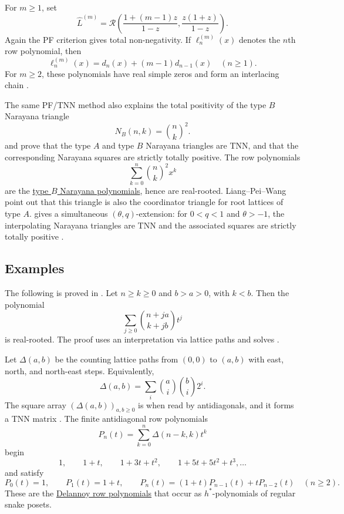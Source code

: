 \begin{example*}
For \(m\geq 1\), set
\[
  \widehat L^{(m)}
  =
  \mathcal R\left(
    \frac{1+(m-1)z}{1-z},
    \frac{z(1+z)}{1-z}
  \right).
\]
Again the PF criterion gives total non-negativity.  If
\(\ell^{(m)}_n(x)\) denotes the \(n\)th row polynomial, then
\[
  \ell^{(m)}_n(x)=d_n(x)+(m-1)d_{n-1}(x)\quad(n\geq 1).
\]
For \(m\geq 2\), these polynomials have real simple zeros and form an
interlacing chain \cite[Rem.~29]{LiangPeiWang2023Coordination}.
\end{example*}

\begin{example*}
The same PF/TNN method also explains the total positivity of the type \(B\)
Narayana triangle 
\[
  N_B(n,k)=\binom{n}{k}^2 .
\]
 and 
\cite{WangYang2018NarayanaMatrices} prove that the type \(A\) and type \(B\)
Narayana triangles are TNN, and that the corresponding Narayana squares are
strictly totally positive.  The row polynomials
\[
  \sum_{k=0}^{n}\binom{n}{k}^2x^k
\]
are the \hyperref[realRootedCatalan]{type \(B\) Narayana polynomials}, hence
are real-rooted.  Liang--Pei--Wang point out that this triangle is also the
coordinator triangle for root lattices of type \(A\).
 gives a simultaneous \((\theta,q)\)-extension: for
\(0<q<1\) and \(\theta>-1\), the interpolating Narayana triangles are TNN
and the associated squares are strictly totally positive
\cite[Thm.~12.3]{Zeng2026qNarayana}.
\end{example*}

\subsection[polyaFrequencyExamples]{Examples}

\begin{example*}
The following is proved in \cite{Yu2009}.  Let \(n\geq k\geq 0\) and
\(b>a>0\), with \(k<b\).  Then the polynomial
\[
  \sum_{j\geq 0} \binom{n+ja}{k+jb} t^j
\]
is real-rooted.  The proof uses an interpretation via lattice paths and
solves \cite[Problem~12]{ForgcsTran2016}.
\end{example*}

\begin{example*}
Let \(\Delta(a,b)\) be the  counting lattice paths
from \((0,0)\) to \((a,b)\) with east, north, and north-east steps.
Equivalently,
\[
  \Delta(a,b)=\sum_i \binom{a}{i}\binom{b}{i}2^i .
\]
The square array \((\Delta(a,b))_{a,b\geq 0}\) is  when read
by antidiagonals, and it forms a TNN matrix \cite[Cor.~5.15]{Brenti1995}.
The finite antidiagonal row polynomials
\[
  P_n(t)=\sum_{k=0}^n \Delta(n-k,k)t^k
\]
begin
\[
  1,\qquad 1+t,\qquad 1+3t+t^2,\qquad 1+5t+5t^2+t^3,\dotsc
\]
and satisfy
\[
  P_0(t)=1,\qquad P_1(t)=1+t,\qquad
  P_n(t)=(1+t)P_{n-1}(t)+tP_{n-2}(t) \quad (n\geq 2).
\]
These are the \hyperref[delannoyRowPolynomials]{Delannoy row polynomials}
that occur as \(h^*\)-polynomials of regular snake posets.
\end{example*}

